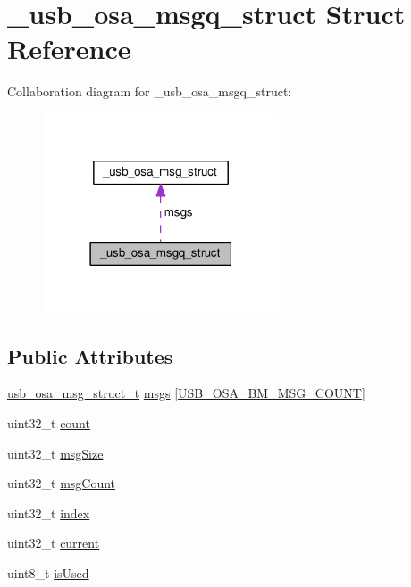 \hypertarget{struct__usb__osa__msgq__struct}{\section{\-\_\-usb\-\_\-osa\-\_\-msgq\-\_\-struct Struct Reference}
\label{struct__usb__osa__msgq__struct}
}


Collaboration diagram for \-\_\-usb\-\_\-osa\-\_\-msgq\-\_\-struct\-:
\nopagebreak
\begin{figure}[H]
\begin{center}
\leavevmode
\includegraphics[width=198pt]{struct__usb__osa__msgq__struct__coll__graph}
\end{center}
\end{figure}
\subsection*{Public Attributes}
\begin{DoxyCompactItemize}
\item 
\hyperlink{usb__osa__bm_8c_a99f4835d327f7180a4e31d0fb57e14fa}{usb\-\_\-osa\-\_\-msg\-\_\-struct\-\_\-t} \hyperlink{struct__usb__osa__msgq__struct_abca5922025c046e9604252a2e5ff3bd7}{msgs} \mbox{[}\hyperlink{usb__osa__bm_8c_a2b5f0f86e134f00be828785d6ec18cc1}{U\-S\-B\-\_\-\-O\-S\-A\-\_\-\-B\-M\-\_\-\-M\-S\-G\-\_\-\-C\-O\-U\-N\-T}\mbox{]}
\item 
uint32\-\_\-t \hyperlink{struct__usb__osa__msgq__struct_a81e789da58dfb43477f28b1becac6b7f}{count}
\item 
uint32\-\_\-t \hyperlink{struct__usb__osa__msgq__struct_a9ca60eac37ed126c806f087e198eee44}{msg\-Size}
\item 
uint32\-\_\-t \hyperlink{struct__usb__osa__msgq__struct_ad3256f6cde77697e233c64bff47ada29}{msg\-Count}
\item 
uint32\-\_\-t \hyperlink{struct__usb__osa__msgq__struct_aadbfed51ddaea472a048ea212e450050}{index}
\item 
uint32\-\_\-t \hyperlink{struct__usb__osa__msgq__struct_ac7756db309b7ab61b6eea39bc496945e}{current}
\item 
uint8\-\_\-t \hyperlink{struct__usb__osa__msgq__struct_a08c7a0bbacca92657d33d6e1a5c392fd}{is\-Used}
\end{DoxyCompactItemize}


